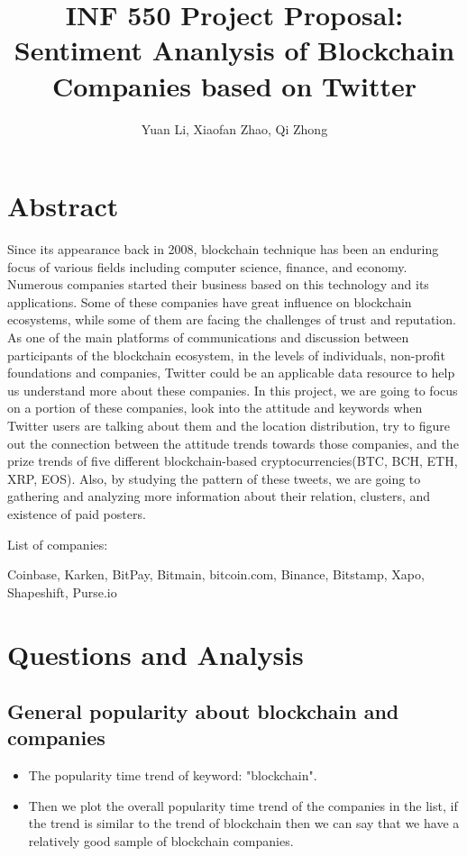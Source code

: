 \documentclass{article}
\begin{document}
\title{INF 550 Project Proposal: Sentiment Ananlysis of Blockchain Companies based on Twitter}
\author{Yuan Li, Xiaofan Zhao, Qi Zhong}
\maketitle
\section{Abstract}
Since its appearance back in 2008, blockchain technique has been an enduring focus of various fields including computer science, finance, and economy. Numerous companies started their business based on this technology and its applications. Some of these companies have great influence on blockchain ecosystems, while some of them are facing the challenges of trust and reputation. As one of the main platforms of communications and discussion between participants of the blockchain ecosystem, in the levels of individuals, non-profit foundations and companies, Twitter could be an applicable data resource to help us understand more about these companies. In this project, we are going to focus on a portion of these companies, look into the attitude and keywords when Twitter users are talking about them and the location distribution, try to figure out the connection between the attitude trends towards those companies, and the prize trends of five different blockchain-based cryptocurrencies(BTC, BCH, ETH, XRP, EOS). Also, by studying the pattern of these tweets, we are going to gathering and analyzing more information about their relation, clusters, and existence of paid posters.

List of companies: 

Coinbase, Karken, BitPay, Bitmain, bitcoin.com, Binance, Bitstamp, Xapo, Shapeshift, Purse.io
\section{Questions and Analysis}
\subsection{General popularity about blockchain and companies}
\begin{itemize}
\item The popularity time trend of keyword: "blockchain".
\item Then we plot the overall popularity time trend of the companies in the list, if the trend is similar to the trend of blockchain then we can say that we have a relatively good sample of blockchain companies.
\end{itemize}
\end{document}
